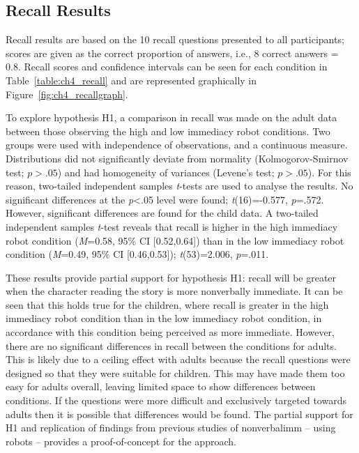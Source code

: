\subsection{Recall Results} \label{sec:res-recall}
Recall results are based on the 10 recall questions presented to all participants; scores are given as the correct proportion of answers, i.e., 8 correct answers = 0.8. Recall scores and confidence intervals can be seen for each condition in Table~\ref{table:ch4_recall} and are represented graphically in Figure~\ref{fig:ch4_recallgraph}.

To explore hypothesis H1, a comparison in recall was made on the adult data between those observing the high and low immediacy robot conditions. Two groups were used with independence of observations, and a continuous measure. Distributions did not significantly deviate from normality (Kolmogorov-Smirnov test; $\textit{p}>.05$) and had homogeneity of variances (Levene's test; $\textit{p}>.05$). For this reason, two-tailed independent samples \textit{t}-tests are used to analyse the results. No significant differences at the \textit{p}\textless .05 level were found; \textit{t}(16)=-0.577, \textit{p}=.572. However, significant differences are found for the child data. A two-tailed independent samples \textit{t}-test reveals that recall is higher in the high immediacy robot condition (\textit{M}=0.58, 95\% CI [0.52,0.64]) than in the low immediacy robot condition (\textit{M}=0.49, 95\% CI [0.46,0.53]); \textit{t}(53)=2.006, \textit{p}=.011.

These results provide partial support for hypothesis H1: recall will be greater when the character reading the story is more nonverbally immediate. It can be seen that this holds true for the children, where recall is greater in the high immediacy robot condition than in the low immediacy robot condition, in accordance with this condition being perceived as more immediate. However, there are no significant differences in recall between the conditions for adults. This is likely due to a ceiling effect with adults because the recall questions were designed so that they were suitable for children. This may have made them too easy for adults overall, leaving limited space to show differences between conditions. If the questions were more difficult and exclusively targeted towards adults then it is possible that differences would be found. The partial support for H1 and replication of findings from previous studies of \gls{nonverbalimm} -- using robots -- provides a proof-of-concept for the approach.

